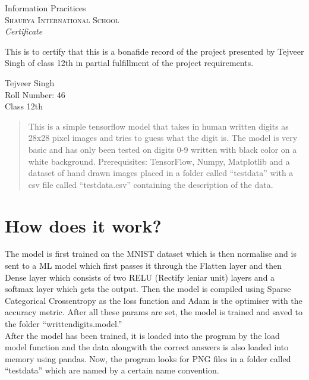 \documentclass{article}
\begin{document}
\begin{center}
\huge{Information Pracitices}\\[0.5cm]
\normalsize
\textsc{Shaurya International School}\\[2.0cm]

\emph{\LARGE Certificate}\\[2.5cm]
\end{center}
\normalsize This is to certify that this is a bonafide record of the project presented by Tejveer Singh of class 12th in partial fulfillment of the project requirements.\\[1.0cm]

\vfill

\begin{flushright}
Tejveer Singh \\
Roll Number: 46\\
Class 12th\\
\end{flushright}

\newpage

\begin{abstract}
This is a simple tensorflow model that takes in human written
digits as 28x28 pixel images and tries to guess what the digit is.
The model is very basic and has only been tested on digits 0-9 written
with black color on a white background. Prerequisites: TensorFlow, Numpy,
Matplotlib and a dataset of hand drawn images placed in a folder called
``testdata'' with a csv file called ``testdata.csv'' containing the description
of the data.
\end{abstract}

\section{How does it work?}
The model is first trained on the MNIST dataset which is then normalise
and is sent to a ML model which first passes it through the Flatten layer
and then Dense layer which consists of two RELU (Rectify leniar unit) layers
and a softmax layer which gets the output. Then the model is compiled
using Sparse Categorical Crossentropy as the loss function and Adam is
the optimiser with the accuracy metric. After all these params are
set, the model is trained and saved to the folder ``writtendigits.model.'' \\

After the model has been trained, it is loaded into the program by the
load model function and the data alongwith the correct answers is
also loaded into memory using pandas. Now, the program looks for PNG files
in a folder called ``testdata'' which are named by a certain name convention. \\
\end{document}
